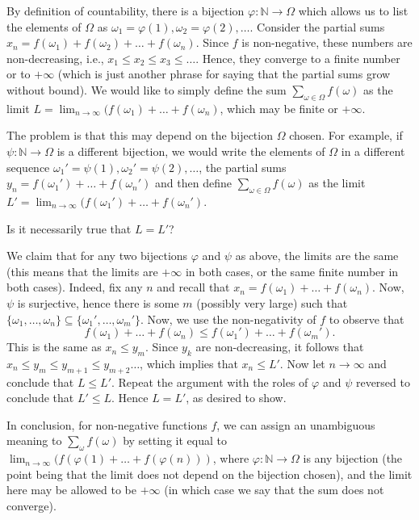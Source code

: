\documentclass[preprint,  11pt]{amsart}
\newcommand{\para}[1]{\vspace{4mm}\noindent{\bfseries #1:}}
\theoremstyle{plain} %
\theoremstyle{definition} %
\begin{document}
\para{The idea} By definition of countability, there is a bijection $\varphi:\mathbb{N}\rightarrow \Omega$ which allows us to list the elements of $\Omega$ as $\omega_{1}=\varphi(1),\omega_{2}=\varphi(2),\ldots$. Consider the partial sums $x_{n}=f(\omega_{1})+f(\omega_{2})+\ldots +f(\omega_{n})$. Since $f$ is non-negative, these numbers are non-decreasing, i.e., $x_{1}\le x_{2}\le x_{3}\le \ldots$. Hence, they converge to a finite number or to $+\infty$ (which is just another phrase for saying that the partial sums grow without bound). We would like to simply define the sum $\sum_{\omega\in \Omega}f(\omega)$ as the limit $L=\lim_{n\rightarrow \infty}(f(\omega_{1})+\ldots +f(\omega_{n})$, which may be finite or $+\infty$.

The problem is that this may depend on the bijection $\Omega$ chosen. For example, if $\psi:\mathbb{N}\rightarrow \Omega$ is a different bijection, we would write the elements of $\Omega$ in a different sequence $\omega_{1}'=\psi(1),\omega_{2}'=\psi(2),\ldots$, the partial sums $y_{n}=f(\omega_{1}')+\ldots +f(\omega_{n}')$ and then define $\sum_{\omega\in \Omega}f(\omega)$ as the limit $L'=\lim_{n\rightarrow \infty}(f(\omega_{1}')+\ldots +f(\omega_{n}')$. 

Is it necessarily true that $L=L'$? 

\para{Case I - Non-negative $f$} We claim that for any two bijections $\varphi$ and $\psi$ as above, the limits are the same (this means that the limits are $+\infty$ in both cases, or the same finite number in both cases). Indeed, fix any $n$ and recall that $x_{n}=f(\omega_{1})+\ldots +f(\omega_{n})$. Now, $\psi$ is surjective, hence there is some $m$ (possibly very large) such that $\{\omega_{1},\ldots,\omega_{n}\}\subseteq \{\omega_{1}',\ldots ,\omega_{m}'\}$. Now, we use the non-negativity of $f$ to observe that 
$$
f(\omega_{1})+\ldots +f(\omega_{n})\le f(\omega_{1}')+\ldots +f(\omega_{m}').
$$ 
This is the same as $x_{n}\le y_{m}$. Since $y_{k}$ are non-decreasing, it follows that $x_{n}\le y_{m}\le y_{m+1}\le y_{m+2}\ldots$, which implies that $x_{n}\le L'$. Now let $n\rightarrow \infty$ and conclude that $L\le L'$. Repeat the argument with the roles of $\varphi$ and $\psi$ reversed to conclude that $L'\le L$. Hence $L=L'$, as desired to show. 

In conclusion, for non-negative functions $f$, we can assign an unambiguous meaning to $\sum_{\omega}f(\omega)$ by setting it equal to $\lim_{n\rightarrow \infty}(f(\varphi(1)+\ldots +f(\varphi(n)))$, where $\varphi:\mathbb{N}\rightarrow \Omega$ is any bijection (the point being that the limit does not depend on the bijection chosen), and the limit here may be allowed to be $+\infty$ (in which case we say that the sum does not converge).
\end{document}
